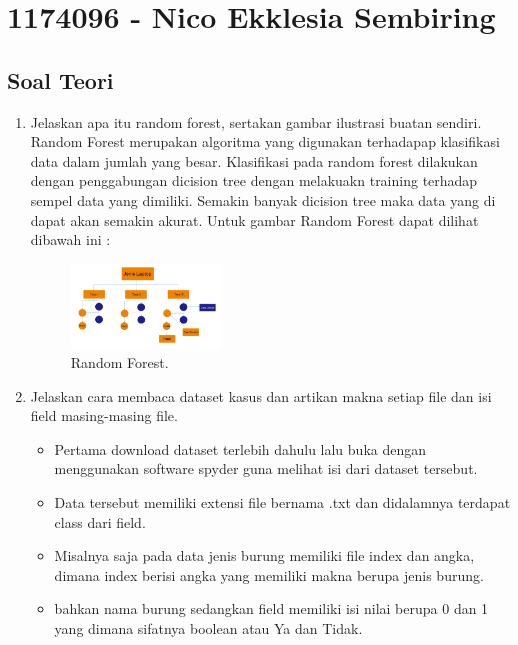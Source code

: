\section{1174096 - Nico Ekklesia Sembiring}
\subsection{Soal Teori}
\begin{enumerate}

	\item Jelaskan apa itu random forest, sertakan gambar ilustrasi buatan sendiri.
	\hfill\break
	Random Forest merupakan algoritma yang digunakan terhadapap klasifikasi data dalam jumlah yang besar. Klasifikasi pada random forest dilakukan dengan penggabungan dicision tree dengan melakuakn training terhadap sempel data yang dimiliki. Semakin banyak dicision tree maka data yang di dapat akan semakin akurat. Untuk gambar Random Forest dapat dilihat dibawah ini :

	\begin{figure}[H]
	\centering
		\includegraphics[width=4cm]{figures/1174096/tugas3/1.PNG}
		\caption{Random Forest.}
	\end{figure}

	\item Jelaskan cara membaca dataset kasus dan artikan makna setiap file dan isi field masing-masing file.
	\hfill\break

	\begin{itemize}
		\item Pertama download dataset terlebih dahulu lalu buka dengan menggunakan software spyder guna melihat isi dari dataset tersebut.

		\item Data tersebut memiliki extensi file bernama .txt dan didalamnya terdapat class dari field.

		\item Misalnya saja pada data jenis burung memiliki file index dan angka, dimana index berisi angka yang memiliki makna berupa jenis burung.

		\item bahkan nama burung sedangkan field memiliki isi nilai berupa 0 dan 1 yang dimana sifatnya boolean atau Ya dan Tidak.


\end{itemize}
\end{enumerate}
